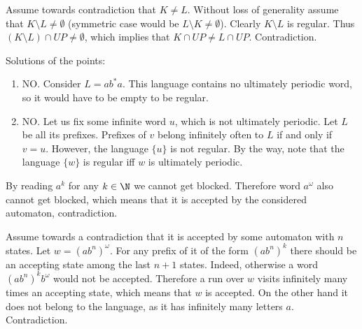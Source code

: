{
Assume towards contradiction that $K \neq L$. Without loss of generality assume that $K \setminus L \neq \emptyset$
(symmetric case would be $L \setminus K \neq \emptyset$). Clearly $K \setminus L$ is regular.
Thus $(K \setminus L) \cap UP \neq \emptyset$, which implies that $K \cap UP \neq L \cap UP$. Contradiction.
}

{
Solutions of the points:
\begin{enumerate}
  \item NO. Consider $L = ab^*a$. This language contains no ultimately periodic word, so it would have to be
  empty to be regular.
  \item NO. Let us fix some infinite word $u$, which is not ultimately periodic. Let $L$ be all its
  prefixes. Prefixes of $v$ belong infinitely often to $L$ if and only if $v = u$. However, the language $\{u\}$ is not
  regular. By the way, note that the language $\{w\}$ is regular iff $w$ is ultimately periodic.
\end{enumerate}
}

{
By reading $a^k$ for any $k \in \N$ we cannot get blocked. Therefore word $a^\omega$ also cannot
get blocked, which means that it is accepted by the considered automaton, contradiction.
}

{
Assume towards a contradiction that it is accepted by some automaton with $n$ states.
Let $w = (a b^n)^{\omega}$. For any prefix of it of the form $(a b^n)^k$ there should be an accepting
state among the last $n+1$ states. Indeed, otherwise a word $(a b^n)^k b^\omega$ would not be accepted.
Therefore a run over $w$ visits infinitely many times an accepting state, which means that $w$ is accepted.
On the other hand it does not belong to the language, as it has infinitely many letters $a$. Contradiction.
}

